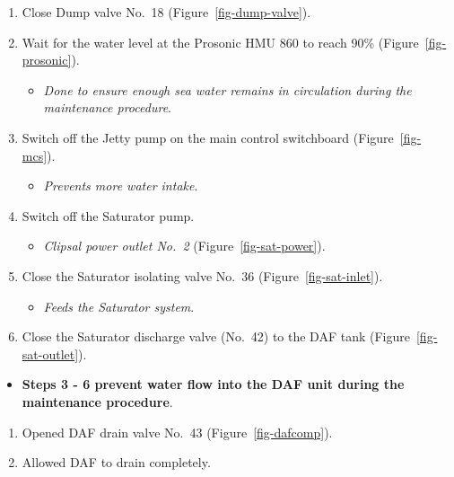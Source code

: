 \documentclass[
  12pt,
]{report}
\providecommand{\tightlist}{%
  \setlength{\itemsep}{0pt}\setlength{\parskip}{0pt}}\usepackage{longtable,booktabs,array}
\begin{document}
\begin{enumerate}
\def\labelenumi{\arabic{enumi}.}
\tightlist
\item
  Close Dump valve No.~18 (Figure~\ref{fig-dump-valve}).
\item
  Wait for the water level at the Prosonic HMU 860 to reach 90\%
  (Figure~\ref{fig-prosonic}).

  \begin{itemize}
  \tightlist
  \item
    \emph{Done to ensure enough sea water remains in circulation during
    the maintenance procedure}.
  \end{itemize}
\item
  Switch off the Jetty pump on the main control switchboard
  (Figure~\ref{fig-mcs}).

  \begin{itemize}
  \tightlist
  \item
    \emph{Prevents more water intake}.
  \end{itemize}
\item
  Switch off the Saturator pump.

  \begin{itemize}
  \tightlist
  \item
    \emph{Clipsal power outlet No.~2} (Figure~\ref{fig-sat-power}).
  \end{itemize}
\item
  Close the Saturator isolating valve No.~36
  (Figure~\ref{fig-sat-inlet}).

  \begin{itemize}
  \tightlist
  \item
    \emph{Feeds the Saturator system}.
  \end{itemize}
\item
  Close the Saturator discharge valve (No.~42) to the DAF tank
  (Figure~\ref{fig-sat-outlet}).
\end{enumerate}

\begin{itemize}
\tightlist
\item
  \textbf{Steps 3 - 6 prevent water flow into the DAF unit during the
  maintenance procedure}.
\end{itemize}

\begin{enumerate}
\def\labelenumi{\arabic{enumi}.}
\setcounter{enumi}{6}
\tightlist
\item
  Opened DAF drain valve No.~43 (Figure~\ref{fig-dafcomp}).
\item
  Allowed DAF to drain completely.
\end{enumerate}
\end{document}
